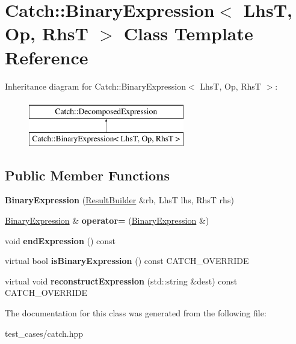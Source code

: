 \hypertarget{classCatch_1_1BinaryExpression}{}\section{Catch\+:\+:Binary\+Expression$<$ LhsT, Op, RhsT $>$ Class Template Reference}
\label{classCatch_1_1BinaryExpression}
Inheritance diagram for Catch\+:\+:Binary\+Expression$<$ LhsT, Op, RhsT $>$\+:\begin{figure}[H]
\begin{center}
\leavevmode
\includegraphics[height=2.000000cm]{classCatch_1_1BinaryExpression}
\end{center}
\end{figure}
\subsection*{Public Member Functions}
\begin{DoxyCompactItemize}
\item 
\mbox{\label{classCatch_1_1BinaryExpression_a0d81384761aba5f7a6d5f4fc7e7944f3}} 
{\bfseries Binary\+Expression} (\hyperlink{classCatch_1_1ResultBuilder}{Result\+Builder} \&rb, LhsT lhs, RhsT rhs)
\item 
\mbox{\label{classCatch_1_1BinaryExpression_a2147a858eb5866e5643d0ef321064aa1}} 
\hyperlink{classCatch_1_1BinaryExpression}{Binary\+Expression} \& {\bfseries operator=} (\hyperlink{classCatch_1_1BinaryExpression}{Binary\+Expression} \&)
\item 
\mbox{\label{classCatch_1_1BinaryExpression_aa1dba7f316f70902859b8eab27692dfb}} 
void {\bfseries end\+Expression} () const
\item 
\mbox{\label{classCatch_1_1BinaryExpression_a4c617c0b6a73a9cafbbf900909c7c258}} 
virtual bool {\bfseries is\+Binary\+Expression} () const C\+A\+T\+C\+H\+\_\+\+O\+V\+E\+R\+R\+I\+DE
\item 
\mbox{\label{classCatch_1_1BinaryExpression_a6ed73ff9af9c229f9fa3d35d019f9e37}} 
virtual void {\bfseries reconstruct\+Expression} (std\+::string \&dest) const C\+A\+T\+C\+H\+\_\+\+O\+V\+E\+R\+R\+I\+DE
\end{DoxyCompactItemize}


The documentation for this class was generated from the following file\+:\begin{DoxyCompactItemize}
\item 
test\+\_\+cases/catch.\+hpp\end{DoxyCompactItemize}
